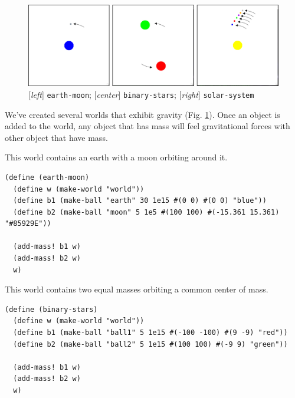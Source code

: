 \documentclass{article}
\begin{document}
\begin{figure}[h!]
  \centering
 \includegraphics[width=\textwidth,height=\textheight,keepaspectratio]{figs/gravity.png}
  \caption{[\textit{left}] \texttt{earth-moon}; [\textit{center}] \texttt{binary-stars}; [\textit{right}] \texttt{solar-system}}
  \label{figure:gravity}
\end{figure}

We've created several worlds that exhibit gravity (Fig. \ref{figure:gravity}). Once an object is added to the world, any object that has mass will feel gravitational forces with other object that have mass.

This world contains an earth with a moon orbiting around it.
{\small\begin{verbatim}
(define (earth-moon)
  (define w (make-world "world"))
  (define b1 (make-ball "earth" 30 1e15 #(0 0) #(0 0) "blue"))
  (define b2 (make-ball "moon" 5 1e5 #(100 100) #(-15.361 15.361) "#85929E"))

  (add-mass! b1 w)
  (add-mass! b2 w)
  w)
\end{verbatim}}

This world contains two equal masses orbiting a common center of mass.
{\small\begin{verbatim}
(define (binary-stars)
  (define w (make-world "world"))
  (define b1 (make-ball "ball1" 5 1e15 #(-100 -100) #(9 -9) "red"))
  (define b2 (make-ball "ball2" 5 1e15 #(100 100) #(-9 9) "green"))

  (add-mass! b1 w)
  (add-mass! b2 w)
  w)
\end{verbatim}}
\end{document}
